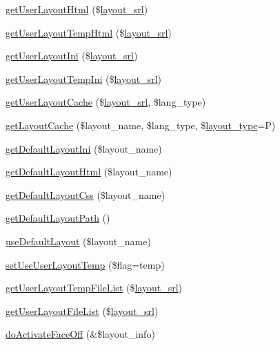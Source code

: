\begin{DoxyCompactItemize}
\item 
\hyperlink{classlayoutModel_ae1d2250f4bb3703f82998937c46a0a57}{get\+User\+Layout\+Html} (\$\hyperlink{ko_8install_8php_a70054876db09b2519a1726663c8dd9e7}{layout\+\_\+srl})
\item 
\hyperlink{classlayoutModel_a19aaacba7d0b1c9bb466534933595381}{get\+User\+Layout\+Temp\+Html} (\$\hyperlink{ko_8install_8php_a70054876db09b2519a1726663c8dd9e7}{layout\+\_\+srl})
\item 
\hyperlink{classlayoutModel_ae52b6a4a0f82631f23b6af7603c0a30e}{get\+User\+Layout\+Ini} (\$\hyperlink{ko_8install_8php_a70054876db09b2519a1726663c8dd9e7}{layout\+\_\+srl})
\item 
\hyperlink{classlayoutModel_a0de830b5db7303b6909568dfdfad2ac3}{get\+User\+Layout\+Temp\+Ini} (\$\hyperlink{ko_8install_8php_a70054876db09b2519a1726663c8dd9e7}{layout\+\_\+srl})
\item 
\hyperlink{classlayoutModel_a54bdf5ad29661e7d2e97e4831cf8832c}{get\+User\+Layout\+Cache} (\$\hyperlink{ko_8install_8php_a70054876db09b2519a1726663c8dd9e7}{layout\+\_\+srl}, \$lang\+\_\+type)
\item 
\hyperlink{classlayoutModel_afdd4cdf78d44f0a042522112818ddf11}{get\+Layout\+Cache} (\$layout\+\_\+name, \$lang\+\_\+type, \$\hyperlink{ko_8install_8php_a0532d89570cfdaebc628afac2ff5a81b}{layout\+\_\+type}=\textquotesingle{}P\textquotesingle{})
\item 
\hyperlink{classlayoutModel_a983d5b4ff865d15ee237385b1c82b5e5}{get\+Default\+Layout\+Ini} (\$layout\+\_\+name)
\item 
\hyperlink{classlayoutModel_a1ec8ba060697878271fc70fbc0ce2867}{get\+Default\+Layout\+Html} (\$layout\+\_\+name)
\item 
\hyperlink{classlayoutModel_a986cf32677527f2efeacb8e5c2bc68e6}{get\+Default\+Layout\+Css} (\$layout\+\_\+name)
\item 
\hyperlink{classlayoutModel_a446c397aaf30fa592cba675f2fbb9495}{get\+Default\+Layout\+Path} ()
\item 
\hyperlink{classlayoutModel_a85dfbba773c086806d4d8c9586d16e52}{use\+Default\+Layout} (\$layout\+\_\+name)
\item 
\hyperlink{classlayoutModel_a513d5dde919e55e29c25889729d087a1}{set\+Use\+User\+Layout\+Temp} (\$flag=\textquotesingle{}temp\textquotesingle{})
\item 
\hyperlink{classlayoutModel_a64f8b7f26a864b7c64d491a83bbf3961}{get\+User\+Layout\+Temp\+File\+List} (\$\hyperlink{ko_8install_8php_a70054876db09b2519a1726663c8dd9e7}{layout\+\_\+srl})
\item 
\hyperlink{classlayoutModel_a068c761aeebdbc423b005a2e793b1b21}{get\+User\+Layout\+File\+List} (\$\hyperlink{ko_8install_8php_a70054876db09b2519a1726663c8dd9e7}{layout\+\_\+srl})
\item 
\hyperlink{classlayoutModel_a09e314ac34d65617cbfd2f1aa5f097a8}{do\+Activate\+Face\+Off} (\&\$layout\+\_\+info)
\end{DoxyCompactItemize}
